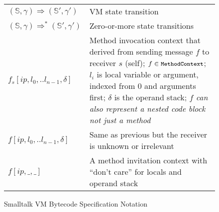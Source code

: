 \documentclass[11pt]{article}
\begin{document}
\begin{figure}
\begin{center}
\begin{tabular}{l p{8cm}}
$(\mathbb{S}, \gamma) \Rightarrow (\mathbb{S}', \gamma')$ & VM state transition\\

$(\mathbb{S}, \gamma) \Rightarrow^* (\mathbb{S}', \gamma')$ & Zero-or-more state transitions\\

$f_s[ip,l_0,..l_{n-1},\delta]$ & Method invocation context that derived from sending message $f$ to receiver $s$ (self);  $f \in \text{\tt\small MethodContext}$; $l_i$ is local variable or argument, indexed from 0 and arguments first; $\delta$ is the operand stack; $f$ {\em can also represent a nested code block not just a  method} \\

$f[ip,l_0,..l_{n-1},\delta]$ & Same as previous but the receiver is unknown or irrelevant \\

$f[ip,\_,\_]$ & A method invitation context with ``don't care'' for locals and operand stack\\

\end{tabular}
\end{center}
\vspace{-10pt}
\caption{\small Smalltalk VM Bytecode Specification Notation}
\label{acfg}
\end{figure} 
\end{document}
